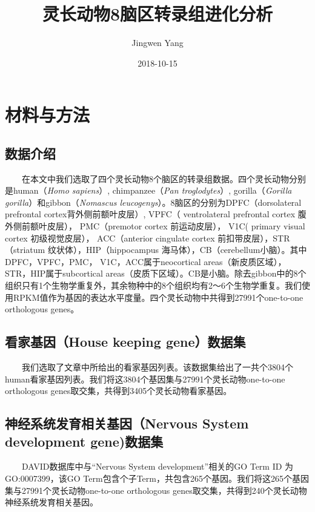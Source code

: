 \documentclass[hyperref,]{ctexart}
\title{灵长动物8脑区转录组进化分析}
\author{Jingwen Yang}
\date{2018-10-15}
\begin{document}
\maketitle

{
\setcounter{tocdepth}{2}
\tableofcontents
}
\section{材料与方法}

\subsection{数据介绍}

  在本文中我们选取了四个灵长动物8个脑区的转录组数据。四个灵长动物分别是human（\emph{Homo
sapiens}）, chimpanzee（\emph{Pan troglodytes}）, gorilla（\emph{Gorilla
gorilla}）和gibbon（\emph{Nomascus
leucogenys}）。8脑区的分别为DPFC（dorsolateral prefrontal
cortex背外侧前额叶皮层）, VPFC（ ventrolateral prefrontal cortex
腹外侧前额叶皮层）， PMC（premotor cortex 前运动皮层）， V1C( primary
visual cortex 初级视觉皮层）， ACC（anterior cingulate cortex
前扣带皮层），STR（striatum 纹状体），HIP（hippocampus
海马体），CB（cerebellum小脑）。其中DPFC，VPFC，PMC，
V1C，ACC属于neocortical areas（新皮质区域），STR，HIP属于subcortical
areas（皮质下区域）。CB是小脑。除去gibbon中的8个组织只有1个生物学重复外，其余物种中的8个组织均有2～6个生物学重复。我们使用RPKM值作为基因的表达水平度量。四个灵长动物中共得到27991个one-to-one
orthologous genes。

\hypertarget{house-keeping-gene}{%
\subsection{看家基因（House keeping
gene）数据集}\label{house-keeping-gene}}

  我们选取了文章中所给出的看家基因列表。该数据集给出了一共个3804个human看家基因列表。我们将这3804个基因集与27991个灵长动物one-to-one
orthologous genes取交集，共得到3405个灵长动物看家基因。

\hypertarget{nervous-system-development-gene}{%
\subsection{神经系统发育相关基因（Nervous System development
gene)数据集}\label{nervous-system-development-gene}}

  DAVID数据库中与``Nervous System development''相关的GO Term ID
为GO:0007399，该GO
Term包含个子Term，共包含265个基因。我们将这265个基因集与27991个灵长动物one-to-one
orthologous genes取交集，共得到240个灵长动物神经系统发育相关基因。
\end{document}
